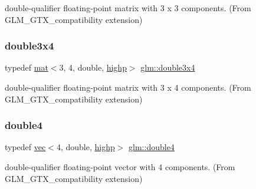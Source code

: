 double-\/qualifier floating-\/point matrix with 3 x 3 components. (From G\+L\+M\+\_\+\+G\+T\+X\+\_\+compatibility extension) 

\mbox{\label{group__gtx__compatibility_gad93d79598c615c80626e270f4357d189}} 
\subsubsection{\texorpdfstring{double3x4}{double3x4}}
{\footnotesize\ttfamily typedef \hyperlink{structglm_1_1mat}{mat}$<$3, 4, double, \hyperlink{namespaceglm_a36ed105b07c7746804d7fdc7cc90ff25ac6f7eab42eacbb10d59a58e95e362074}{highp}$>$ \hyperlink{group__gtx__compatibility_gad93d79598c615c80626e270f4357d189}{glm\+::double3x4}}



double-\/qualifier floating-\/point matrix with 3 x 4 components. (From G\+L\+M\+\_\+\+G\+T\+X\+\_\+compatibility extension) 

\mbox{\label{group__gtx__compatibility_gadfb754a50db97dcefbd7a3435ad6eda4}} 
\subsubsection{\texorpdfstring{double4}{double4}}
{\footnotesize\ttfamily typedef \hyperlink{structglm_1_1vec}{vec}$<$4, double, \hyperlink{namespaceglm_a36ed105b07c7746804d7fdc7cc90ff25ac6f7eab42eacbb10d59a58e95e362074}{highp}$>$ \hyperlink{group__gtx__compatibility_gadfb754a50db97dcefbd7a3435ad6eda4}{glm\+::double4}}



double-\/qualifier floating-\/point vector with 4 components. (From G\+L\+M\+\_\+\+G\+T\+X\+\_\+compatibility extension) 

\mbox{\label{group__gtx__compatibility_ga5ca0eb6627cf8829e3cab6694d1a6452}} 
